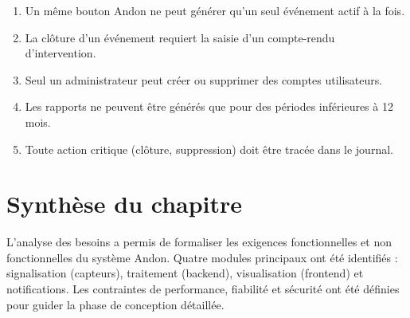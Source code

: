 \begin{enumerate}
    \item Un m\^eme bouton Andon ne peut g\'en\'erer qu'un seul \'ev\'enement actif \`a la fois.
    \item La cl\^oture d'un \'ev\'enement requiert la saisie d'un compte-rendu d'intervention.
    \item Seul un administrateur peut cr\'eer ou supprimer des comptes utilisateurs.
    \item Les rapports ne peuvent \^etre g\'en\'er\'es que pour des p\'eriodes inf\'erieures \`a 12 mois.
    \item Toute action critique (cl\^oture, suppression) doit \^etre trac\'ee dans le journal.
\end{enumerate}

\section{Synth\`ese du chapitre}

L'analyse des besoins a permis de formaliser les exigences fonctionnelles et non fonctionnelles du syst\`eme Andon. Quatre modules principaux ont \'et\'e identifi\'es : signalisation (capteurs), traitement (backend), visualisation (frontend) et notifications. Les contraintes de performance, fiabilit\'e et s\'ecurit\'e ont \'et\'e d\'efinies pour guider la phase de conception d\'etaill\'ee.
